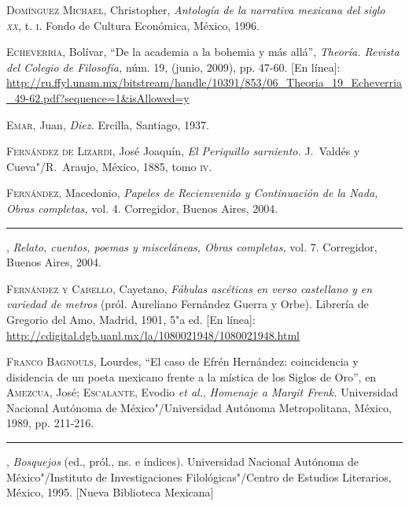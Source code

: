 \documentclass[14pt,twoside,final]{extbook} %
\begin{document}
\textsc{Domínguez Michael}, Christopher, \emph{Antología de la narrativa mexicana del siglo \textsc{xx},} t. \textsc{i}. Fondo de Cultura Económica, México, 1996.\label{bib:dominguez1996}

\textsc{Echeverría}, Bolívar, ``De la academia a la bohemia y más allá'', \emph{Theoría. Revista del Colegio de Filosofía,} núm. 19, (junio, 2009), pp. 47-60. [En línea]: \url{http://ru.ffyl.unam.mx/bitstream/handle/10391/853/06_Theoria_19_Echeverria_49-62.pdf?sequence=1&isAllowed=y}\label{bib:echeverria2009}

\textsc{Emar}, Juan, \emph{Diez.} Ercilla, Santiago, 1937.\label{bib:emar1937}

\textsc{Fernández de Lizardi}, José Joaquín, \emph{El Periquillo sarniento.} J.~Valdés y Cueva"/R.~Araujo, México, 1885, tomo \textsc{iv}.\label{bib:fernandezlizardi1885}

\textsc{Fernández}, Macedonio, \emph{Papeles de Recienvenido y Continuación de la Nada, Obras completas,} vol. 4. Corregidor, Buenos Aires, 2004.\label{bib:fernandez2004a}

\rule{1cm}{0.4pt}, \emph{Relato, cuentos, poemas y misceláneas, Obras completas,} vol. 7. Corregidor, Buenos Aires, 2004.\label{bib:fernandez2004b}

\textsc{Fernández y Cabello}, Cayetano, \emph{Fábulas ascéticas en verso castellano y en variedad de metros} (pról. Aureliano Fernández Guerra y Orbe). Librería de Gregorio del Amo, Madrid, 1901, 5"a ed. [En línea]: \url{http://cdigital.dgb.uanl.mx/la/1080021948/1080021948.html}\label{bib:fcabello1901}

\textsc{Franco Bagnouls}, Lourdes, ``El caso de Efrén Hernández: coincidencia y disidencia de un poeta mexicano frente a la mística de los Siglos de Oro'', en \textsc{Amezcua}, José; \textsc{Escalante}, Evodio \emph{et al.}, \emph{Homenaje a Margit Frenk.} Universidad Nacional Autónoma de México"/Universidad Autónoma Metropolitana, México, 1989, pp. 211-216.\label{bib:franco1989}

\rule{1cm}{0.4pt}, \emph{Bosquejos} (ed., pról., ns. e índices). Universidad Nacional Autónoma de México"/Instituto de Investigaciones Filológicas"/Centro de Estudios Literarios, México, 1995. [Nueva Biblioteca Mexicana]\label{bib:franco1995}
\end{document}
